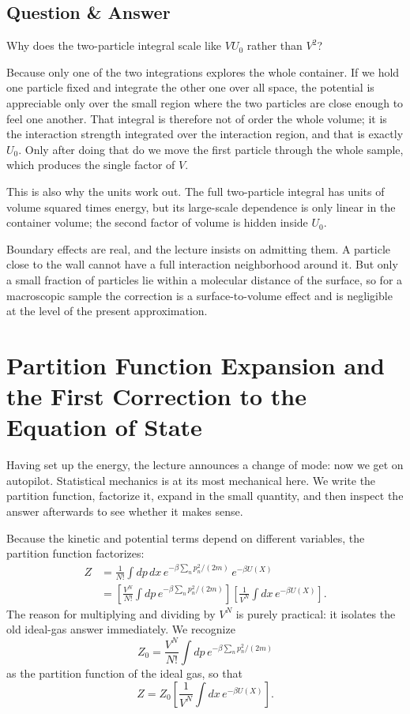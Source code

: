 \subsection{Question \& Answer}

Why does the two-particle integral scale like \(V U_0\) rather than \(V^2\)?

Because only one of the two integrations explores the whole container. If we hold one particle fixed and integrate the other one over all space, the potential is appreciable only over the small region where the two particles are close enough to feel one another. That integral is therefore not of order the whole volume; it is the interaction strength integrated over the interaction region, and that is exactly \(U_0\). Only after doing that do we move the first particle through the whole sample, which produces the single factor of \(V\).

This is also why the units work out. The full two-particle integral has units of volume squared times energy, but its large-scale dependence is only linear in the container volume; the second factor of volume is hidden inside \(U_0\).

Boundary effects are real, and the lecture insists on admitting them. A particle close to the wall cannot have a full interaction neighborhood around it. But only a small fraction of particles lie within a molecular distance of the surface, so for a macroscopic sample the correction is a surface-to-volume effect and is negligible at the level of the present approximation.

\section{Partition Function Expansion and the First Correction to the Equation of State}

Having set up the energy, the lecture announces a change of mode: now we get on autopilot. Statistical mechanics is at its most mechanical here. We write the partition function, factorize it, expand in the small quantity, and then inspect the answer afterwards to see whether it makes sense.

Because the kinetic and potential terms depend on different variables, the partition function factorizes:
\begin{align}
Z
&=\frac{1}{N!}\int dp\,dx\,
e^{-\beta\sum_n p_n^2/(2m)}\,e^{-\beta U(X)} \\
&=\left[\frac{V^N}{N!}\int dp\,e^{-\beta\sum_n p_n^2/(2m)}\right]
\left[\frac{1}{V^N}\int dx\,e^{-\beta U(X)}\right].
\end{align}
The reason for multiplying and dividing by \(V^N\) is purely practical: it isolates the old ideal-gas answer immediately. We recognize
\begin{equation}
Z_0=\frac{V^N}{N!}\int dp\,e^{-\beta\sum_n p_n^2/(2m)}
\end{equation}
as the partition function of the ideal gas, so that
\begin{equation}
Z=Z_0\left[\frac{1}{V^N}\int dx\,e^{-\beta U(X)}\right].
\end{equation}

